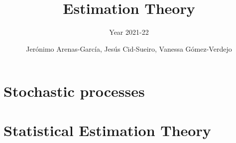 \documentclass[graybox,envcountchap,sectrefs]{svmono_mod}
\begin{document}
\author{Jer\'onimo Arenas-Garc\'ia, Jes\'us Cid-Sueiro, Vanessa G\'omez-Verdejo}
\title{Estimation Theory}
\subtitle{Year 2021-22}

\frontmatter%

%
%
%
%
%

%
%
\chapter{Stochastic processes}

\chapter{Statistical Estimation Theory}
\mainmatter %
\tableofcontents








% 

\backmatter%
%
%
\printindex
\end{document}
